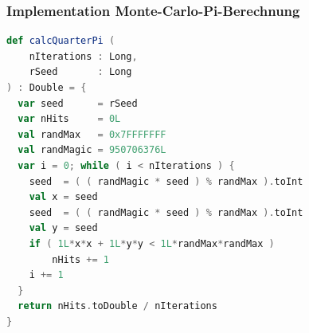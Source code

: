 \begin{frame}
\begin{columns}
\begin{column}{0.65\linewidth}
    \end{column}\end{columns}
\end{frame}

\begin{frame}[fragile]
    \frametitle{Implementation Monte-Carlo-Pi-Berechnung}
    \begin{lstlisting}[language=scala]
def calcQuarterPi (
    nIterations : Long,
    rSeed       : Long
) : Double = {
  var seed      = rSeed
  var nHits     = 0L
  val randMax   = 0x7FFFFFFF
  val randMagic = 950706376L
  var i = 0; while ( i < nIterations ) {
    seed  = ( ( randMagic * seed ) % randMax ).toInt
    val x = seed
    seed  = ( ( randMagic * seed ) % randMax ).toInt
    val y = seed
    if ( 1L*x*x + 1L*y*y < 1L*randMax*randMax )
        nHits += 1
    i += 1
  }
  return nHits.toDouble / nIterations
}
\end{lstlisting}
\end{frame}

